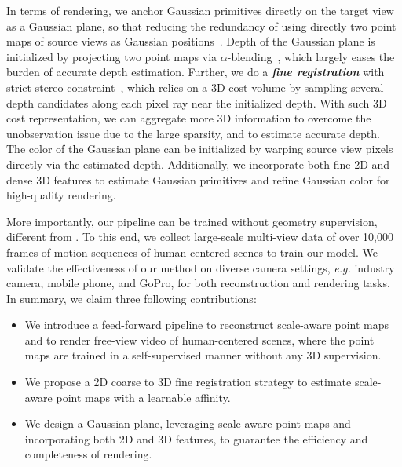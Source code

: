 In terms of rendering, we anchor Gaussian primitives directly on the target view as a Gaussian plane, so that reducing the redundancy of using directly two point maps of source views as Gaussian positions~\cite{zheng2024gpsgaussian, chen2024mvsplat, smart2024splatt3r, ye2024nopose}.
%
Depth of the Gaussian plane is initialized by projecting two point maps via $\alpha$-blending~\cite{kerbl2023_3dgs}, which largely eases the burden of accurate depth estimation.
%
Further, we do a \textbf{\textit{fine registration}} with strict stereo constraint~\cite{yao2018mvsnet, lin2022enerf, liu2024mvsgaussian}, which relies on a 3D cost volume by sampling several depth candidates along each pixel ray near the initialized depth. 
%
With such 3D cost representation, we can aggregate more 3D information to overcome the unobservation issue due to the large sparsity, and to estimate accurate depth.  
%
The color of the Gaussian plane can be initialized by warping source view pixels directly via the estimated depth.
%
Additionally, we incorporate both fine 2D and dense 3D features to estimate Gaussian primitives and refine Gaussian color for high-quality rendering.


More importantly, our pipeline can be trained without geometry supervision, different from \cite{wang2024dust3r, leroy2024grounding, wang2024moge}.
%
To this end, we collect large-scale multi-view data of over 10,000 frames of motion sequences of human-centered scenes to train our model.
%
We validate the effectiveness of our method on diverse camera settings, \textit{e.g.} industry camera, mobile phone, and GoPro, for both reconstruction and rendering tasks.
%
In summary, we claim three following contributions:
\begin{itemize}
    \item We introduce a feed-forward pipeline to reconstruct scale-aware point maps and to render free-view video of human-centered scenes, where the point maps are trained in a self-supervised manner without any 3D supervision. 
    \item We propose a 2D coarse to 3D fine registration strategy to estimate scale-aware point maps with a learnable affinity.
    \item We design a Gaussian plane, leveraging scale-aware point maps and incorporating both 2D and 3D features, to guarantee the efficiency and completeness of rendering.
\end{itemize}
